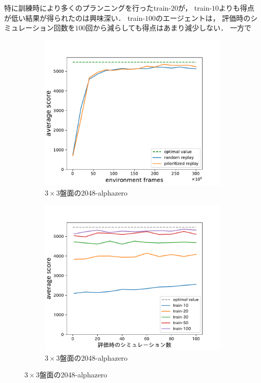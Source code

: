 特に訓練時により多くのプランニングを行ったtrain-$20$が， train-$10$よりも得点が低い結果が得られたのは興味深い．
train-$100$のエージェントは， 評価時のシミュレーション回数を$100$回から減らしても得点はあまり減少しない．
一方で
\begin{figure}
    \begin{subfigure}[T]{0.5\columnwidth}
        \centering
        \includegraphics[width=\columnwidth]{figures/alphazero_3x3.pdf}
        \caption{$3\times3$盤面の2048-alphazero}
        \label{fig:mini2048_alphazero}
    \end{subfigure}
    \begin{subfigure}[T]{0.5\columnwidth}
        \centering
        \includegraphics[width=\columnwidth]{figures/3x3_2048_alphazero_simulations.pdf}
        \caption{$3\times3$盤面の2048-alphazero}
        \label{fig:mini2048_alphazero_simulations}
    \end{subfigure}
\end{figure}

